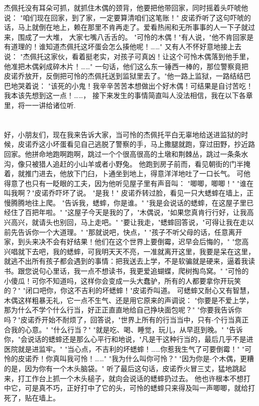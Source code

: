 \documentclass[12pt,UTF8]{ctexbook}
\begin{document}
杰佩托没有耳朵可抓，就抓住木偶的颈背，他要把他带回家，同时摇着头吓唬他说：
"咱们现在回家，到了家，一定要算清咱们这笔账！"
皮诺乔听了这句吓唬的话，马上就倒在地上，赖在那里不肯再走了。爱看热闹和无所事事的人一下子就过来，围成了一大堆，
大家七嘴八舌舌的。
"可怜的木偶！"有人说，"他不肯回家是有道理的！谁知道杰佩托这坏蛋会怎么揍他呢！……"
又有人不怀好意地接上去说：
"杰佩托这家伙，看着挺老实，对孩子可真凶！让这个可怜木偶落到他手里，他准把木偶剁成碎木片！……"
一句话，他们这么东一锤西一棒的，那位警察竟把皮诺乔放开，反倒把可怜的杰佩托送到监狱里去了。"他一路上监狱，一路结结巴巴地哭着说：
"该死的小鬼！我辛辛苦苦本想做出个好木偶！可结果是自讨苦吃！我本该先想到这一点！……，
接下来发生的事情简直叫人没法相信，我在以下各章里，将一一讲给诸位听.

\chapter{}

好，小朋友们，现在我来告诉大家，当可怜的杰佩托平白无辜地给送进监狱的时候，皮诺乔这小坏蛋看见自己逃脱了警察的手，马上撒腿就跑，穿过田野，抄近路回家。他拼命地跑啊跑啊，跳过一个个很高很高的土墩和荆棘丛，跳过一条条水沟，像只被猎人追赶的小山羊或者小野兔。
他跑到房子前而，看见朝街的门半掩着，就推门进去，他放下门臼，卜通坐到地上，得意洋洋地吐了一口长气。
可他得意了也只有一眨眼的工夫，因为他听见屋子里有声音叫：
"唧唧，唧唧！"
"谁在叫我啊？"皮诺乔吓坏了说。
"是我！"
皮诺乔转过脸，看见一只大蟋蟀在墙上，正慢腾腾地往上爬。
"告诉我，蟋蟀，你是谁。"
"我是会说话的蟋蟀，在这屋子里已经住了百把年啦。"
"这屋子今天是我的了，"木偶说，"如果您真肯行行好，让我高兴高兴，就请头也别回，马上走吧。"
"要让我走，"蟋蟀回答说，"可得让我在走以前先告诉你一个大道理。"
"那就说吧，快点，"
"孩子不听父母的话，任意离开家，到头来决不会有好结果！他们在这个世界上要倒霉，迟早会后悔的，"
"您高兴唱就下去吧，我的蟋蟀，可我明天天不亮，一准就离开这里，我要是呆在这里，就逃不出所有孩子都会遇到的事情：把我送去上学，不是软骗就是硬来，逼着我读书。跟您说句心里话，我一点不想读书，我更爱追蝴蝶，爬树掏鸟窝。"
"可怜的小傻瓜！可你不知道吗，这样你会变成一头大蠢驴，所有的人都要拿你开玩笑的？"
"闭口吧你，你这不吉利的坏蟋蟀！"皮诺乔叫道。
可蟋蟀又耐心又有智慧，木偶这样粗暴无礼，它一点不生气、还是用它原来的声调说：
"你要是不爱上学，那为什么不学个什么行当，好正正直直地给自己挣块面包呢？"
"你要我告诉你吗？"皮诺乔开始不耐烦了，回答说，"世界上所有的行当当中，只有-个行当真正合我的心意。"
"什么行当？"
"就是吃、喝、睡觉，玩儿，从早逛到晚。"
"告诉你，"会说话的蟋蟀还是那么心平行和地说，"凡是干这种行当的，最后几乎不是进医院就是进监牢。"
"当心点，不吉利的坏蟋蟀！……你惹我生气了可要倒霉！"
"可怜的皮诺乔！你真叫我可怜！……"
"我为什么叫你可怜？"
"因为你是-个木偶，更糟的是，因为你有一个木头脑袋。"
听了最后这句话，皮诺乔火冒三丈，猛地跳起来，打工作台上抓一个木头槌子，就向会说话的蟋蟀扔过去。
他也许根本不想打中它，可是真不巧，正好打中了它的头，可怜的蟋蟀只来得及叫一声唧唧，就给打死了，贴在墙上。
\end{document}
